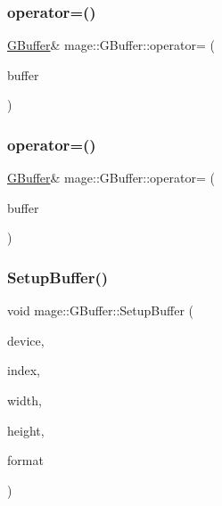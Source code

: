 \hypertarget{structmage_1_1_g_buffer_ac4b12cce6a06866958f3a674d7a7dcae}{}\label{structmage_1_1_g_buffer_ac4b12cce6a06866958f3a674d7a7dcae} 
\subsubsection{\texorpdfstring{operator=()}{operator=()}\hspace{0.1cm}{\footnotesize\ttfamily [1/2]}}
{\footnotesize\ttfamily \hyperlink{structmage_1_1_g_buffer}{G\+Buffer}\& mage\+::\+G\+Buffer\+::operator= (\begin{DoxyParamCaption}\item[{const \hyperlink{structmage_1_1_g_buffer}{G\+Buffer} \&}]{buffer }\end{DoxyParamCaption})\hspace{0.3cm}{\ttfamily [delete]}}

\hypertarget{structmage_1_1_g_buffer_ab1d4ae70de89c0549f54ee76b0b078c3}{}\label{structmage_1_1_g_buffer_ab1d4ae70de89c0549f54ee76b0b078c3} 
\subsubsection{\texorpdfstring{operator=()}{operator=()}\hspace{0.1cm}{\footnotesize\ttfamily [2/2]}}
{\footnotesize\ttfamily \hyperlink{structmage_1_1_g_buffer}{G\+Buffer}\& mage\+::\+G\+Buffer\+::operator= (\begin{DoxyParamCaption}\item[{\hyperlink{structmage_1_1_g_buffer}{G\+Buffer} \&\&}]{buffer }\end{DoxyParamCaption})\hspace{0.3cm}{\ttfamily [delete]}}

\hypertarget{structmage_1_1_g_buffer_a598e55e0b309fd9b8ec8605d5f91cf32}{}\label{structmage_1_1_g_buffer_a598e55e0b309fd9b8ec8605d5f91cf32} 
\subsubsection{\texorpdfstring{Setup\+Buffer()}{SetupBuffer()}}
{\footnotesize\ttfamily void mage\+::\+G\+Buffer\+::\+Setup\+Buffer (\begin{DoxyParamCaption}\item[{I\+D3\+D11\+Device2 $\ast$}]{device,  }\item[{U\+I\+NT}]{index,  }\item[{U\+I\+NT}]{width,  }\item[{U\+I\+NT}]{height,  }\item[{D\+X\+G\+I\+\_\+\+F\+O\+R\+M\+AT}]{format }\end{DoxyParamCaption})\hspace{0.3cm}{\ttfamily [private]}}

